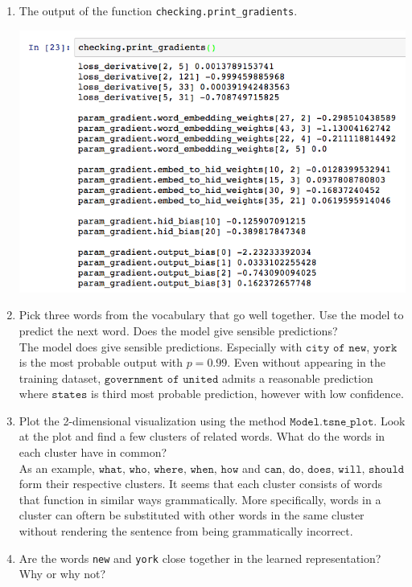 \documentclass[11pt]{article}
\begin{document}
\begin{enumerate}
\begin{center}
    \end{center}
    \item The output of the function \texttt{checking.print\_gradients}.
    \begin{center}
        \includegraphics[width=15cm]{print_gradient.png}
    \end{center}
    \item Pick three words from the vocabulary that go well together. Use the model to predict the next word. Does the model give sensible predictions?  \\ 
    The model does give sensible predictions. Especially with $\texttt{city of new}$, $\texttt{york}$ is the most probable output with $p=0.99$. Even without appearing in the training dataset, $\texttt{government of united}$ admits a reasonable prediction where $\texttt{states}$ is third most probable prediction, however with low confidence.
    \item Plot the 2-dimensional visualization using the method $\texttt{Model.tsne\_plot}$. Look at the plot and find a few clusters of related words. What do the words in each cluster have in common? \\ 
    As an example, $\texttt{what, who, where, when, how}$ and $\texttt{can, do, does, will, should}$ form their respective clusters. It seems that each cluster consists of words that function in similar ways grammatically. More specifically, words in a cluster can oftern be substituted with other words in the same cluster without rendering the sentence from being grammatically incorrect.
    \item Are the words \texttt{new} and \texttt{york} close together in the learned representation? Why or why not? \\

\end{enumerate}
\end{document}
